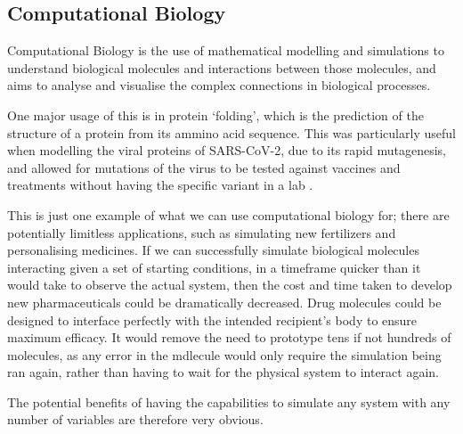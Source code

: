 {}
\subsection*{Computational Biology}

Computational Biology is the use of mathematical modelling and simulations to understand biological molecules and interactions between those molecules, and aims to analyse and visualise the complex connections in biological processes.

One major usage of this is in protein `folding', which is the prediction of the structure of a protein from its ammino acid sequence. This was particularly useful when modelling the viral proteins of SARS-CoV-2, due to its rapid mutagenesis, and allowed for mutations of the virus to be tested against vaccines and treatments without having the specific variant in a lab \cite{biom12111665, modern_techniques_cov}.

This is just one example of what we can use computational biology for; there are potentially limitless applications, such as simulating new fertilizers and personalising medicines. If we can successfully simulate biological molecules interacting given a set of starting conditions, in a timeframe quicker than it would take to observe the actual system, then the cost and time taken to develop new pharmaceuticals could be dramatically decreased. Drug molecules could be designed to interface perfectly with the intended recipient's body to ensure maximum efficacy. It would remove the need to prototype tens if not hundreds of molecules, as any error in the mdlecule would only require the simulation being ran again, rather than having to wait for the physical system to interact again.

The potential benefits of having the capabilities to simulate any system with any number of variables are therefore very obvious. 

